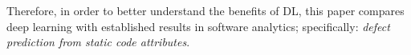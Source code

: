 \documentclass[10pt,compsoc,twocolumn]{IEEEtran}
\newcommand{\bi}{\begin{itemize}}
\begin{document}
Therefore,
in order to  better understand the benefits of DL, 
this paper
compares deep learning with  established results in software analytics;
specifically: {\em defect prediction from static code attributes}.
\end{document}
